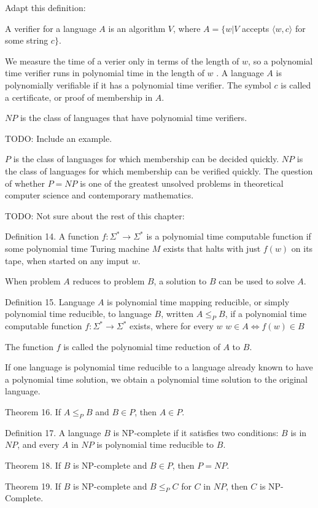 {\color{red} Adapt this definition:
\begin{definition}
A verifier for a language $A$ is an algorithm $V$, where $A=\{w|V$ accepts $\langle w, c\rangle$ for some string $c\}$.
\end{definition}
}

{\color{red} We measure the time of a verier only in terms of the length of $w$, so a polynomial time verifier runs in polynomial time in the length of $w$
. A language $A$ is polynomially verifiable if it has a polynomial time verifier. The symbol $c$ is called a certificate, or proof of membership in $A$.}

{\color{red}
\begin{definition}
$NP$ is the class of languages that have polynomial time verifiers.
\end{definition}
}


{\color{red} TODO: Include an example.}

{\color{red} $P$ is the class of languages for which membership can be decided quickly. $NP$ is the class of languages for which membership can be verified quickly. The question of whether $P=NP$ is one of the greatest unsolved problems in theoretical computer science and contemporary mathematics.}


{\color{red} TODO: Not sure about the rest of this chapter:

Definition 14. A function $f:\Sigma^{\ast}\rightarrow\Sigma^{\ast}$ is a polynomial time computable function if some polynomial time Turing machine $M$ exists that halts with just $f(w)$ on its tape, when started on any imput $w$.

When problem $A$ reduces to problem $B$, a solution to $B$ can be used to solve $A$.

Definition 15. Language $A$ is polynomial time mapping reducible, or simply polynomial time reducible, to language $B$, written $A\leq_{P}B$, if a polynomial time computable function $f:\Sigma^{\ast}\rightarrow\Sigma^{\ast}$ exists, where for every $w$ $w\in A\iff f(w)\in B$

The function $f$ is called the polynomial time reduction of $A$ to $B$.

If one language is polynomial time reducible to a language already known to have a polynomial time solution, we obtain a polynomial time solution to the original language.

Theorem 16. If $A\leq_{P}B$ and $B\in P$, then $A\in P$.

Definition 17. A language $B$ is NP-complete if it satisfies two conditions: $B$ is in $NP$, and every $A$ in $NP$ is polynomial time reducible to $B$.

Theorem 18. If $B$ is NP-complete and $B\in P$, then $P=NP$.

Theorem 19. If $B$ is NP-complete and $B\leq_{P}C$ for $C$ in $NP$, then $C$ is NP-Complete.

}

